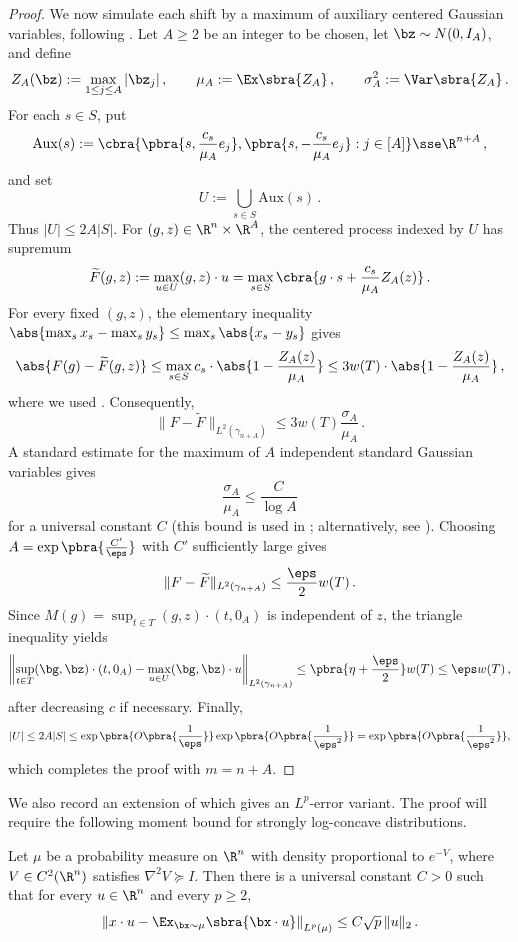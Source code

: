\documentclass[11pt]{article}
\begin{document}
\begin{proof}
	We now simulate each shift by a maximum of auxiliary centered Gaussian variables, following \cite[Corollary~23]{de2026sparsifying}.
	Let $A\geq2$ be an integer to be chosen, let $\bz\sim N(0,I_A)$, and define
	\[
		Z_A(\bz):=\max_{1\leq j\leq A}|\bz_j|\,,
		\qquad
		\mu_A:=\Ex\sbra{Z_A}\,,
		\qquad
		\sigma_A^2:=\Var\sbra{Z_A}\,.
	\]
	For each $s\in S$, put
	\[
		\mathrm{Aux}(s)
		:=
		\cbra{
			\pbra{s,\frac{c_s}{\mu_A}e_j},
			\pbra{s,-\frac{c_s}{\mu_A}e_j}
			:
			j\in[A]
		}
		\sse \R^{n+A}\,,
	\]
	and set
	\[
		U:=\bigcup_{s\in S}\mathrm{Aux}(s)\,.
	\]
	Thus $|U|\leq2A|S|$.
	For $(g,z)\in\R^n\times\R^A$, the centered process indexed by $U$ has supremum
	\[
		\widetilde F(g,z)
		:=
		\max_{u\in U}(g,z)\cdot u
		=
		\max_{s\in S}\cbra{
			g\cdot s+\frac{c_s}{\mu_A}Z_A(z)
		}\,.
	\]
	For every fixed $(g,z)$, the elementary inequality
	$\abs{\max_s x_s-\max_s y_s}\leq\max_s\abs{x_s-y_s}$ gives
	\[
		\abs{F(g)-\widetilde F(g,z)}
		\leq
		\max_{s\in S}c_s\cdot
		\abs{1-\frac{Z_A(z)}{\mu_A}}
		\leq
		3w(T)\cdot
		\abs{1-\frac{Z_A(z)}{\mu_A}}\,,
	\]
	where we used .
	Consequently,
	\[
		\|F-\widetilde F\|_{L^2(\gamma_{n+A})}
		\leq
		3w(T)\frac{\sigma_A}{\mu_A}\,.
	\]
	A standard estimate for the maximum of $A$ independent standard Gaussian variables gives
	\[
		\frac{\sigma_A}{\mu_A}
		\leq
		\frac{C}{\log A}
	\]
	for a universal constant $C$ (this bound is used in \cite[Corollary~23]{de2026sparsifying}; alternatively, see \cite[Appendix~A.2]{chatterjee2014superconcentration}).
	Choosing $A=\exp\pbra{\frac{C'}{\eps}}$ with $C'$ sufficiently large gives
	\[
		\|F-\widetilde F\|_{L^2(\gamma_{n+A})}
		\leq
		\frac{\eps}{2}w(T)\,.
	\]
	Since $M(g)=\sup_{t\in T}(g,z)\cdot(t,0_A)$ is independent of $z$, the triangle inequality yields
	\[
		\left\|
			\sup_{t\in T}(\bg,\bz)\cdot(t,0_A)
			-
			\max_{u\in U}(\bg,\bz)\cdot u
		\right\|_{L^2(\gamma_{n+A})}
		\leq
		\pbra{\eta+\frac{\eps}{2}}w(T)
		\leq
		\eps w(T)\,,
	\]
	after decreasing $c$ if necessary.
	Finally,
	\[
		|U|
		\leq
		2A|S|
		\leq
		\exp\pbra{O\pbra{\frac1{\eps}}}
		\exp\pbra{O\pbra{\frac1{\eps^2}}}
		=
		\exp\pbra{O\pbra{\frac1{\eps^2}}},
	\]
	which completes the proof with $m=n+A$.
\end{proof}

We also record an extension of  which gives an $L^p$-error variant.  
The proof will require the following moment bound for strongly log-concave distributions. 

\begin{lemma} 
\label{lemma:LSI-strongly-log-concave}
	Let $\mu$ be a probability measure on $\R^n$ with density proportional to $e^{-V}$, where $V\in C^2(\R^n)$ satisfies $\nabla^2 V \succeq I$.
	Then there is a universal constant $C>0$ such that for every $u\in\R^n$
	and every $p\geq2$,
	\[
		\left\|
			x\cdot u-\Ex_{\bx\sim\mu}\sbra{\bx\cdot u}
		\right\|_{L^p(\mu)}
		\leq
		C\sqrt p\,\|u\|_2\,.
	\]
\end{lemma}
\end{document}
